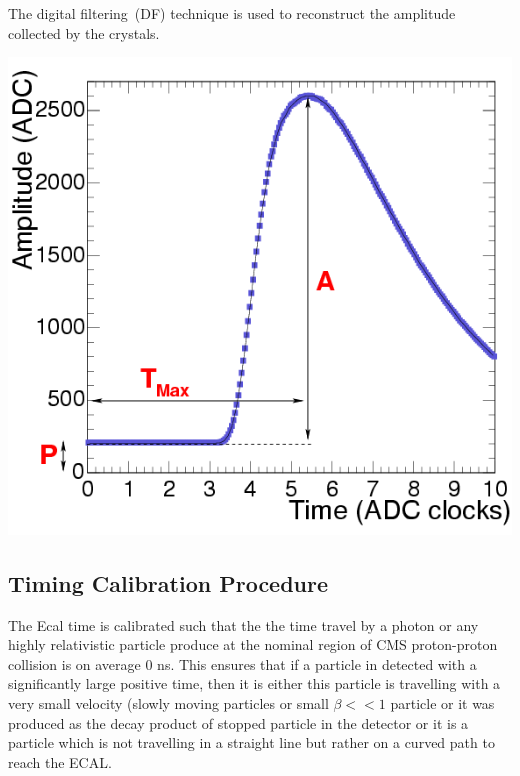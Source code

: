 The digital  filtering~(DF) technique is used to reconstruct the amplitude collected by the \pb crystals.
\begin{center}\label{CMSECAL}
\centering
\mbox{\includegraphics[scale=0.6]{THESISPLOTS/Time_Amplitude_Profile.png}}
\label{fig:CMSECAL}
\end{center}
\subsection{Timing Calibration Procedure}
The Ecal time is calibrated such that the the time travel by a photon or any highly relativistic  particle  produce at the nominal region of CMS proton-proton collision is on average 0 ns. This ensures that if a particle in detected with a significantly large positive time, then it is either this particle is travelling with a very small velocity (slowly moving particles or small $\beta << 1$ particle or it was produced as the decay product of stopped particle in the detector or it is a particle which is not travelling in a straight line but rather on a curved path to reach the ECAL.


